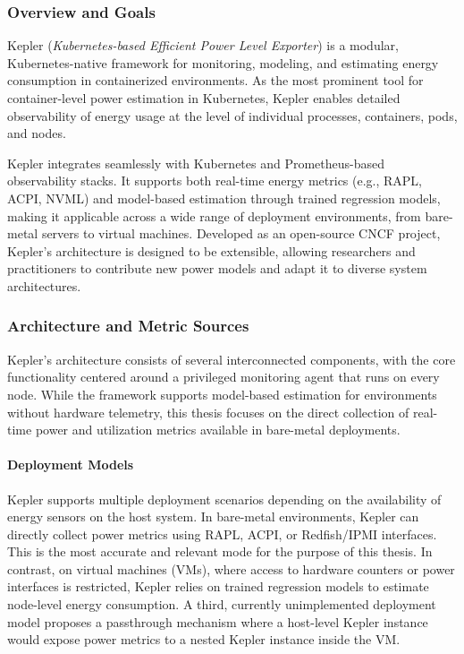 \subsubsection{Overview and Goals}
\label{sec:kepler-overview}

Kepler (\textit{Kubernetes-based Efficient Power Level Exporter})\parencite{kepler_energy} is a modular, Kubernetes-native framework for monitoring, modeling, and estimating energy consumption in containerized environments. As the most prominent tool for container-level power estimation in Kubernetes, Kepler enables detailed observability of energy usage at the level of individual processes, containers, pods, and nodes\parencite{amaralKeplerFrameworkCalculate2023}.

Kepler integrates seamlessly with Kubernetes and Prometheus-based observability stacks. It supports both real-time energy metrics (e.g., RAPL, ACPI, NVML) and model-based estimation through trained regression models, making it applicable across a wide range of deployment environments, from bare-metal servers to virtual machines. Developed as an open-source CNCF project, Kepler’s architecture is designed to be extensible, allowing researchers and practitioners to contribute new power models and adapt it to diverse system architectures.

\subsubsection{Architecture and Metric Sources}
\label{sec:kepler-architecture}

Kepler's architecture consists of several interconnected components, with the core functionality centered around a privileged monitoring agent that runs on every node. While the framework supports model-based estimation for environments without hardware telemetry, this thesis focuses on the direct collection of real-time power and utilization metrics available in bare-metal deployments.

\paragraph{Deployment Models}
Kepler supports multiple deployment scenarios depending on the availability of energy sensors on the host system. In bare-metal environments, Kepler can directly collect power metrics using RAPL, ACPI, or Redfish/IPMI interfaces. This is the most accurate and relevant mode for the purpose of this thesis. In contrast, on virtual machines (VMs), where access to hardware counters or power interfaces is restricted, Kepler relies on trained regression models to estimate node-level energy consumption. A third, currently unimplemented deployment model proposes a passthrough mechanism where a host-level Kepler instance would expose power metrics to a nested Kepler instance inside the VM.

